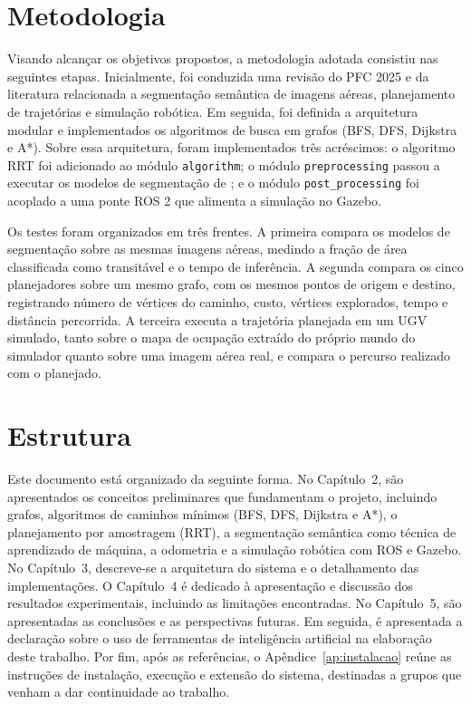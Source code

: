 \documentclass[
    12pt,
    openright,
    oneside,
    a4paper,
    english,
    brazil
]{abntex2}
\begin{document}
\section{Metodologia}

Visando alcançar os objetivos propostos, a metodologia adotada consistiu nas seguintes etapas. Inicialmente, foi conduzida uma revisão do PFC 2025 \cite{camelo2025} e da literatura relacionada a segmentação semântica de imagens aéreas, planejamento de trajetórias e simulação robótica. Em seguida, foi definida a arquitetura modular e implementados os algoritmos de busca em grafos (BFS, DFS, Dijkstra e A*). Sobre essa arquitetura, foram implementados três acréscimos: o algoritmo RRT foi adicionado ao módulo \texttt{algorithm}; o módulo \texttt{preprocessing} passou a executar os modelos de segmentação de \cite{junior2024_models}; e o módulo \texttt{post\_\allowbreak{}processing} foi acoplado a uma ponte ROS 2 que alimenta a simulação no Gazebo.

Os testes foram organizados em três frentes. A primeira compara os modelos de segmentação sobre as mesmas imagens aéreas, medindo a fração de área classificada como transitável e o tempo de inferência. A segunda compara os cinco planejadores sobre um mesmo grafo, com os mesmos pontos de origem e destino, registrando número de vértices do caminho, custo, vértices explorados, tempo e distância percorrida. A terceira executa a trajetória planejada em um UGV simulado, tanto sobre o mapa de ocupação extraído do próprio mundo do simulador quanto sobre uma imagem aérea real, e compara o percurso realizado com o planejado.

\section{Estrutura}

Este documento está organizado da seguinte forma. No Capítulo~2, são apresentados os conceitos preliminares que fundamentam o projeto, incluindo grafos, algoritmos de caminhos mínimos (BFS, DFS, Dijkstra e A*), o planejamento por amostragem (RRT), a segmentação semântica como técnica de aprendizado de máquina, a odometria e a simulação robótica com ROS e Gazebo. No Capítulo~3, descreve-se a arquitetura do sistema e o detalhamento das implementações. O Capítulo~4 é dedicado à apresentação e discussão dos resultados experimentais, incluindo as limitações encontradas. No Capítulo~5, são apresentadas as conclusões e as perspectivas futuras. Em seguida, é apresentada a declaração sobre o uso de ferramentas de inteligência artificial na elaboração deste trabalho. Por fim, após as referências, o Apêndice~\ref{ap:instalacao} reúne as instruções de instalação, execução e extensão do sistema, destinadas a grupos que venham a dar continuidade ao trabalho.
\end{document}
